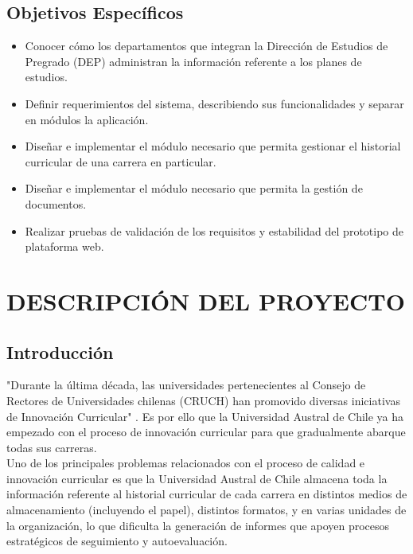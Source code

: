 \documentclass[12pt]{article}
\begin{document}
		\subsection{Objetivos Específicos}
		\begin{large}
			
			\begin{itemize}
				\item Conocer cómo los departamentos que integran la Dirección de Estudios de Pregrado (DEP) administran
				la información referente a los planes de estudios.
				\item  Definir requerimientos del sistema, describiendo sus funcionalidades y separar en módulos la aplicación.
				\item Diseñar e implementar el módulo necesario que permita gestionar el historial curricular de una carrera en particular.
				\item Diseñar e implementar el módulo necesario que permita la gestión de documentos.
				\item Realizar pruebas de validación de los requisitos y estabilidad del prototipo de plataforma web.
			\end{itemize}
		\end{large}
		\newpage
		
	\section{DESCRIPCIÓN DEL PROYECTO}
	
		\subsection{Introducción}
		
		"Durante la última década, las universidades pertenecientes al Consejo de Rectores de Universidades chilenas (CRUCH) 
		han promovido diversas iniciativas de Innovación Curricular" \cite{INN11}. Es por ello que la Universidad Austral de 
		Chile ya ha empezado con el proceso de innovación curricular para que gradualmente abarque todas sus carreras.
		\\
		
		Uno de los principales problemas relacionados con el proceso de calidad e innovación curricular es que la Universidad 
		Austral de Chile almacena toda la información referente al historial curricular de cada carrera en distintos medios 
		de almacenamiento (incluyendo el papel), distintos  formatos, y en varias unidades de la organización, lo que 
		dificulta la generación de informes que apoyen procesos estratégicos de seguimiento y autoevaluación.
		\\
		
\end{document}
